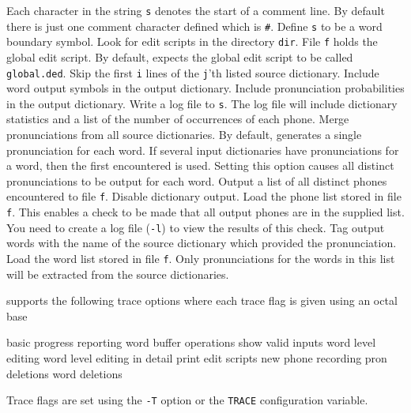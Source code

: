 \begin{optlist}

   Each character in the string \texttt{s} denotes the
      start of a comment line.  By default there is just one
      comment character defined which is \texttt{\#}.
    Define \texttt{s} to be a word boundary symbol.
   Look for edit scripts in the directory \texttt{dir}.
    File \texttt{f} holds the global edit script.  By
     default,  expects the global edit script to be
     called \texttt{global.ded}.
   Skip the first \texttt{i} lines of the \texttt{j}'th
     listed source dictionary.
   Include word output symbols in the output dictionary.
   Include pronunciation probabilities in the output dictionary.
   Write a log file to \texttt{s}.  The log file will include
     dictionary statistics and a list of the number of occurrences
     of each phone.
   Merge pronunciations from all source dictionaries.  By default,
     generates a single pronunciation for each word.  If several
    input dictionaries have pronunciations for a word, then the first encountered
    is used.  Setting this option causes all distinct pronunciations to be
    output for each word.
   Output a list of all distinct phones encountered 
     to file \texttt{f}.
   Disable dictionary output.
    Load the phone list stored in file \texttt{f}.  This
     enables a check to be made that all output phones are in the supplied
     list. You need to create a log file (\texttt{-l}) to view the results of 
     this check.
    Tag output words with the name of the source dictionary which
    provided the pronunciation.
    Load the word list stored in file \texttt{f}.  Only 
    pronunciations for the words in this list will be extracted from
    the source dictionaries. 
\stdoptQ
\end{optlist}


 supports the following trace options where each
trace flag is given using an octal base
\begin{optlist}
    basic progress reporting 
    word buffer operations 
    show valid inputs 
    word level editing 
    word level editing in detail 
    print edit scripts 
    new phone recording 
    pron deletions 
    word deletions                    
\end{optlist}
Trace flags are set using the \texttt{-T} option or the  \texttt{TRACE} 
configuration variable.


